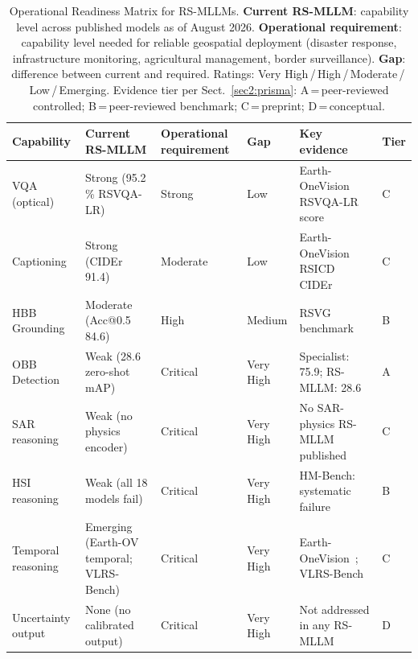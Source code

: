 \begin{table}[t]
\caption{Operational Readiness Matrix for RS-MLLMs. \textbf{Current RS-MLLM}:
capability level across published models as of August 2026.
\textbf{Operational requirement}: capability level needed for reliable
geospatial deployment (disaster response, infrastructure monitoring,
agricultural management, border surveillance).
\textbf{Gap}: difference between current and required.
Ratings: Very High\,/\,High\,/\,Moderate\,/\,Low\,/\,Emerging.
Evidence tier per Sect.~\ref{sec2:prisma}: A\,=\,peer-reviewed controlled;
B\,=\,peer-reviewed benchmark; C\,=\,preprint; D\,=\,conceptual.
}\label{tab:orm}
\small\setlength\tabcolsep{3pt}
\begin{tabular*}{\textwidth}{@{\extracolsep\fill}p{2.4cm}p{2.6cm}p{2.8cm}p{1.6cm}p{3.2cm}p{0.7cm}}
\toprule
\textbf{Capability} & \textbf{Current RS-MLLM} & \textbf{Operational requirement} & \textbf{Gap} & \textbf{Key evidence} & \textbf{Tier} \\
\midrule
VQA (optical)        & Strong (95.2\,\% RSVQA-LR)    & Strong                  & Low         & Earth-OneVision RSVQA-LR score~\cite{earthonevision2026}             & C \\
Captioning           & Strong (CIDEr 91.4)            & Moderate                & Low         & Earth-OneVision RSICD CIDEr~\cite{earthonevision2026}                & C \\
HBB Grounding        & Moderate (Acc@0.5 84.6)        & High                    & Medium      & RSVG benchmark~\cite{rsvg2023}                                       & B \\
OBB Detection        & Weak (28.6 zero-shot mAP)      & Critical                & Very High   & Specialist: 75.9; RS-MLLM: 28.6~\cite{xie2021orientedrcnn,geochat2024} & A \\
SAR reasoning        & Weak (no physics encoder)      & Critical                & Very High   & No SAR-physics RS-MLLM published~\cite{sarchatchat2025}              & C \\
HSI reasoning        & Weak (all 18 models fail)      & Critical                & Very High   & HM-Bench: systematic failure~\cite{hmbench2026}                      & B \\
Temporal reasoning   & Emerging (Earth-OV temporal; VLRS-Bench) & Critical                & Very High   & Earth-OneVision~\cite{earthonevision2026}; VLRS-Bench~\cite{vlrsbench2026}     & C \\
Uncertainty output   & None (no calibrated output)    & Critical                & Very High   & Not addressed in any RS-MLLM                                         & D \\

\end{tabular*}
\end{table}
